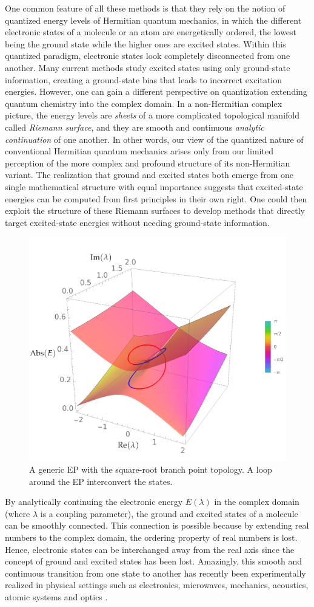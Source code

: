 \documentclass[11pt,a4paper]{article}
\begin{document}
One common feature of all these methods is that they rely on the notion of quantized energy levels of Hermitian quantum mechanics, in which the different electronic states of a molecule or an atom are energetically ordered, the lowest being the ground state while the higher ones are excited states. 
Within this quantized paradigm, electronic states look completely disconnected from one another.
Many current methods study excited states using only ground-state information, creating a ground-state bias that leads to incorrect excitation energies.
However, one can gain a different perspective on quantization extending quantum chemistry into the complex domain.
In a non-Hermitian complex picture, the energy levels are \textit{sheets} of a more complicated topological manifold called \textit{Riemann surface}, and they are smooth and continuous \textit{analytic continuation} of one another.
In other words, our view of the quantized nature of conventional Hermitian quantum mechanics arises only from our limited perception of the more complex and profound structure of its non-Hermitian variant.
The realization that ground and excited states both emerge from one single mathematical structure with equal importance suggests that excited-state energies can be computed from first principles in their own right.
One could then exploit the structure of these Riemann surfaces to develop methods that directly target excited-state energies without needing ground-state information.

\begin{figure}
    \centering
    \includegraphics[width=0.5\linewidth]{TopologyEP.pdf}
    \caption{A generic EP with the square-root branch point topology. A loop around the EP interconvert the states.}
    \label{fig:TopologyEP}
\end{figure}
By analytically continuing the electronic energy $E(\lambda)$ in the complex domain (where $\lambda$ is a coupling parameter), the ground and excited states of a molecule can be smoothly connected.
This connection is possible because by extending real numbers to the complex domain, the ordering property of real numbers is lost.
Hence, electronic states can be interchanged away from the real axis since the concept of ground and excited states has been lost.
Amazingly, this smooth and continuous transition from one state to another has recently been experimentally realized in physical settings such as electronics, microwaves, mechanics, acoustics, atomic systems and optics \cite{Bittner_2012, Chong_2011, Chtchelkatchev_2012, Doppler_2016, Guo_2009, Hang_2013, Liertzer_2012, Longhi_2010, Peng_2014, Peng_2014a, Regensburger_2012, Ruter_2010, Schindler_2011, Szameit_2011, Zhao_2010, Zheng_2013, Choi_2018, El-Ganainy_2018}.
\end{document}
